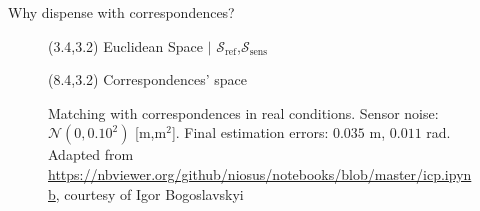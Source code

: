 \begin{frame}[noframenumbering]{Why dispense with correspondences?}


  \begin{figure}\vspace{1cm}
    \caption{Matching with correspondences in real conditions. Sensor noise:
             $\mathcal{N}(0, 0.10^2)$ [m,m$^2$]. Final estimation errors:
             $0.035$ m, $0.011$ rad. Adapted from
             \url{https://nbviewer.org/github/niosus/notebooks/blob/master/icp.ipynb},
              courtesy of Igor Bogoslavskyi}
    \begin{textblock}{5}(3.4,3.2)
      \scriptsize Euclidean Space $|$ \textcolor{r}{$\mathcal{S}_{\text{ref}}$},\textcolor{b}{$\mathcal{S}_{\text{sens}}$}
    \end{textblock}
    \begin{textblock}{4}(8.4,3.2)
      \scriptsize Correspondences' space
    \end{textblock}
  \end{figure}

\end{frame}
